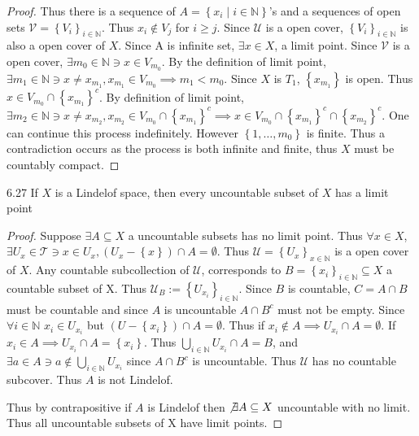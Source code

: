 \documentclass{article}
\newcommand*{\T}{\mathcal{T}}
\newcommand*{\subeq}{\subseteq}
\newcommand*{\empset}{\emptyset}
\newcommand{\N}{\mathbb{N}}
\begin{document}
\begin{proof}
    Thus there is a sequence of $A = \left\{ x_i \mid i \in \N \right\}$'s and a sequences of open sets $\mathcal{V} = \left\{ V_i \right\}_{i \in \N}$. Thus $x_i \not \in V_{j}$ for $i \geq j$. Since $\mathcal{U}$ is a open cover, $\left\{ V_i \right\}_{i \in \N}$ is also a open cover of $X$. Since A is infinite set, $\exists x \in X$, a limit point. Since $\mathcal{V}$ is a open cover, $\exists m_0 \in \N \ni x \in V_{m_0}$. By the definition of limit point, $\exists  m_1 \in \N \ni x \neq x_{m_1}, x_{m_1} \in V_{m_0} \implies m_1 < m_0$. Since $X$ is $T_1$, $\left\{ x_{m_1} \right\}$ is open. Thus $x \in V_{m_0} \cap \left\{ x_{m_1} \right\}^c$. By definition of limit point, $\exists m_2 \in \N \ni x \neq x_{m_2}, x_{m_2} \in V_{m_0} \cap \left\{ x_{m_1} \right\}^c \implies x \in V_{m_0} \cap \left\{ x_{m_1} \right\}^c \cap \left\{ x_{m_2} \right\}^c$. One can continue this process indefinitely. However $\left\{ 1, \dots, m_0 \right\}$ is finite. Thus a contradiction occurs as the process is both infinite and finite, thus $X$ must be countably compact.                     
\end{proof}

\bigskip

\begin{claim}{6.27}\label{Claim 6.27.}
    If $X$ is a Lindelof space, then every uncountable subset of $X$ has a limit point   
\end{claim}
\begin{proof}
    Suppose $\exists A \subeq X$ a uncountable subsets has no limit point. Thus $\forall x \in X$, $\exists U_x \in \T \ni x \in U_x, \left(U_x - \left\{ x \right\}\right) \cap A = \empset$. Thus $\mathcal{U} = \left\{ U_x \right\}_{x \in \N}$ is a open cover of $X$. Any countable subcollection of $\mathcal{U}$, corresponds to $
    B = \left\{ x_i \right\}_{i \in \N} \subseteq X$ a countable subset of X. Thus $\mathcal{U}_B := \left\{ U_{x_i} \right\}_{i \in \N}$. Since $B$ is countable, $C = A \cap B$ must be countable and since $A$ is uncountable $A \cap B^c$ must not be empty. Since $\forall i \in \N$ $x_i \in U_{x_i}$ but $(U - \left\{ x_i \right\}) \cap A = \empset$. Thus if $x_i \not \in A \implies U_{x_i} \cap A = \empset$. If $x_i \in A \implies U_{x_i} \cap A = \left\{ x_i \right\}$. Thus $\bigcup_{i \in \N} U_{x_i} \cap A = B$, and $\exists a \in A \ni a \not \in \bigcup_{i \in \N} U_{x_i}$ since $A \cap B^c$ is uncountable. Thus $\mathcal{U}$ has no countable subcover. Thus $A$ is not Lindelof. 
    
    Thus by contrapositive if $A$ is Lindelof then $\not \exists A \subeq X$ uncountable with no limit. Thus all uncountable subsets of X have limit points.    
\end{proof}
\end{document}
